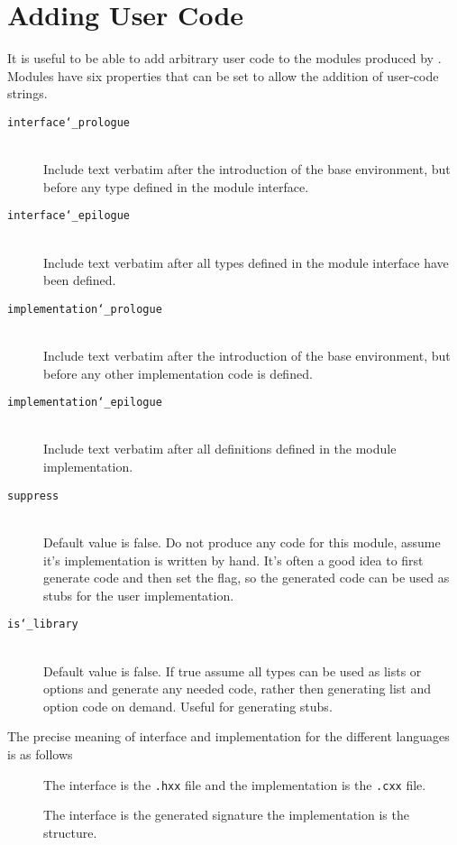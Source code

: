 \section{Adding User Code}
It is useful to be able to add arbitrary user code to the modules
produced by \asdlgen{}.
Modules have six properties that can be set to allow
the addition of user-code strings. 
\begin{description}
  \item[\texttt{interface\char`\_prologue}]\mbox{}\\
    Include text verbatim after the introduction of the base
    environment, but before any type defined in the module interface.

  \item[\texttt{interface\char`\_epilogue}]\mbox{}\\
    Include text verbatim after all types defined in the module
    interface have been defined.
	
  \item[\texttt{implementation\char`\_prologue}]\mbox{}\\
    Include text verbatim after the introduction of the base
    environment, but before any other implementation code is defined.
	
  \item[\texttt{implementation\char`\_epilogue}]\mbox{}\\
   Include text verbatim after all definitions defined in the module
   implementation.  

  \item[\texttt{suppress}]\mbox{}\\
   Default value is false. Do not produce any code for this module, 
   assume it's implementation is 
   written by hand. It's often a good idea to first generate code and then
   set the flag, so the generated code can be used as stubs for the 
   user implementation.

  \item[\texttt{is\char`\_library}]\mbox{}\\
   Default value is false. If true assume all types can be used
   as lists or options and generate any needed code, rather then 
   generating list and option code on demand. Useful for generating stubs.

\end{description}%

The precise meaning of interface and implementation for the different
languages is as follows
\begin{description}
  \item[\Cplusplus{}]
    The interface is the \texttt{.hxx} file and the implementation is the \texttt{.cxx}
    file.
  \item[\sml{}]
    The interface is the generated signature the implementation is the structure.
\end{description}%

